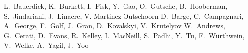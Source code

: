 \begin{Authlist}
%
L.~Bauerdick, K.~Burkett, I.~Fisk, Y.~Gao, O.~Gutsche, B.~Hooberman, S.~Jindariani,  J.~Linacre, V. Martinez Outschoorn
%
D.~Barge, C.~Campagnari, A.~George, F.~Golf, J.~Gran, D.~Kovalskyi, V.~Krutelyov
%
W.~Andrews, G.~Cerati, D.~Evans, R.~Kelley, I.~MacNeill, S.~Padhi, Y.~Tu, F.~W\"urthwein, V.~Welke, A.~Yagil, J.~Yoo

\end{Authlist}

